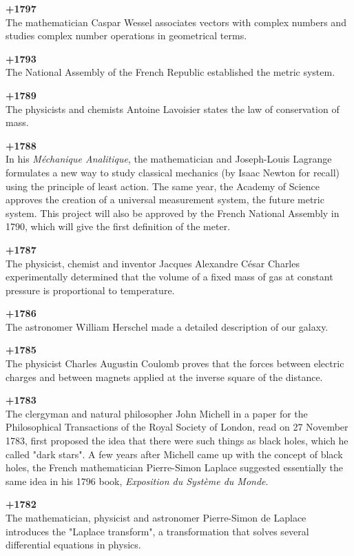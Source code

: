 \textbf{+1797}\\
The mathematician Caspar Wessel associates vectors with complex numbers and studies complex number operations in geometrical terms.

\textbf{+1793}\\
The National Assembly of the French Republic established the metric system.

\textbf{+1789}\\
The physicists and chemists Antoine Lavoisier states the law of conservation of mass.

\textbf{+1788}\\
In his \textit{Méchanique Analitique}, the mathematician and Joseph-Louis Lagrange formulates a new way to study classical mechanics (by Isaac Newton for recall) using the principle of least action. The same year, the Academy of Science approves the creation of a universal measurement system, the future metric system. This project will also be approved by the French National Assembly in 1790, which will give the first definition of the meter.

\textbf{+1787}\\
The physicist, chemist and inventor Jacques Alexandre César Charles experimentally determined that the volume of a fixed mass of gas at constant pressure is proportional to temperature.

\textbf{+1786}\\
The astronomer William Herschel made a detailed description of our galaxy.

\textbf{+1785}\\
The physicist Charles Augustin Coulomb proves that the forces between electric charges and between magnets applied at the inverse square of the distance.

\textbf{+1783}\\
The clergyman and natural philosopher John Michell in a paper for the Philosophical Transactions of the Royal Society of London, read on 27 November 1783, first proposed the idea that there were such things as black holes, which he called "dark stars". A few years after Michell came up with the concept of black holes, the French mathematician Pierre-Simon Laplace suggested essentially the same idea in his 1796 book, \textit{Exposition du Système du Monde}. 

\textbf{+1782}\\
The mathematician, physicist and astronomer Pierre-Simon de Laplace introduces the "Laplace transform", a transformation that solves several differential equations in physics.


